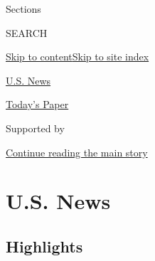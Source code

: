 Sections

SEARCH

\protect\hyperlink{site-content}{Skip to
content}\protect\hyperlink{site-index}{Skip to site index}

\href{https://www.nytimes3xbfgragh.onion/section/us}{U.S. News}

\href{https://myaccount.nytimes3xbfgragh.onion/auth/login?response_type=cookie\&client_id=vi}{}

\href{https://www.nytimes3xbfgragh.onion/section/todayspaper}{Today's
Paper}

Supported by

\protect\hyperlink{after-sponsor}{Continue reading the main story}

\hypertarget{us-news}{%
\section{U.S. News}\label{us-news}}

\hypertarget{highlights}{%
\subsection{Highlights}\label{highlights}}


